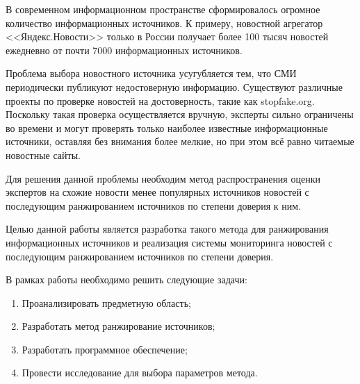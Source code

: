 \Introduction

В современном информационном пространстве сформировалось огромное количество информационных источников. К примеру, новостной агрегатор <<Яндекс.Новости>> только в России получает более 100 тысяч новостей ежедневно от почти 7000 информационных источников.

Проблема выбора новостного источника усугубляется тем, что СМИ периодически публикуют недостоверную информацию. Существуют различные проекты по проверке новостей на достоверность, такие как stopfake.org. Поскольку такая проверка осуществляется вручную, эксперты сильно ограничены во времени и могут проверять только наиболее известные информационные источники, оставляя без внимания более мелкие, но при этом всё равно читаемые новостные сайты.

Для решения данной проблемы необходим метод распространения оценки экспертов на схожие новости менее популярных источников новостей с последующим ранжированием источников по степени доверия к ним.

Целью данной работы является разработка такого метода для ранжирования информационных источников и реализация системы мониторинга новостей с последующим ранжированием источников по степени доверия.

В рамках работы необходимо решить следующие задачи:
\begin{enumerate}
    \item Проанализировать предметную область;
    \item Разработать метод ранжирование источников;
    \item Разработать программное обеспечение;
    \item Провести исследование для выбора параметров метода.
\end{enumerate}
